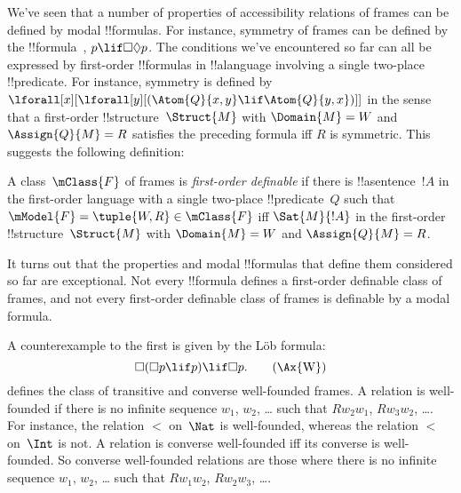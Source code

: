 \documentclass[../../../include/open-logic-section]{subfiles}
\begin{document}

We've seen that a number of properties of accessibility relations of
frames can be defined by modal !!{formula}s. For instance, symmetry of
frames can be defined by the !!{formula}~, $p \lif \Box\Diamond
p$. The conditions we've encountered so far can all be expressed by
first-order !!{formula}s in !!a{language} involving a single two-place
!!{predicate}. For instance, symmetry is defined by
$\lforall[x][\lforall[y][(\Atom{Q}{x,y} \lif \Atom{Q}{y, x})]]$ in the
sense that a first-order !!{structure}~$\Struct{M}$ with $\Domain{M} =
W$ and $\Assign{Q}{M} = R$ satisfies the preceding formula iff $R$ is
symmetric. This suggests the following definition:

\begin{defn}
  A class~$\mClass{F}$ of frames is \emph{first-order definable} if there is
  !!a{sentence}~$!A$ in the first-order language with a single
  two-place !!{predicate}~$Q$ such that $\mModel{F} =
  \tuple{W, R} \in \mClass{F}$ iff $\Sat{M}{!A}$ in the first-order
  !!{structure}~$\Struct{M}$ with $\Domain{M} = W$ and $\Assign{Q}{M}
  = R$.
\end{defn}

It turns out that the properties and modal !!{formula}s that define
them considered so far are exceptional. Not every !!{formula} defines
a first-order definable class of frames, and not every first-order
definable class of frames is definable by a modal formula.

A counterexample to the first is given by the L\"ob formula:
\begin{equation}
\Box(\Box p \lif p) \lif \Box p. \tag{\Ax{W}}
\end{equation}
 defines the class of transitive and converse well-founded
frames. A relation is well-founded if there is no infinite sequence
$w_1$, $w_2$, \dots{} such that $Rw_2w_1$, $Rw_3w_2$, \dots. For
instance, the relation $<$ on~$\Nat$ is well-founded, whereas the
relation $<$ on~$\Int$ is not. A relation is converse well-founded
iff its converse is well-founded. So converse well-founded relations
are those where there is no infinite sequence $w_1$, $w_2$, \dots{}
such that $Rw_1w_2$, $Rw_2w_3$, \dots. 
\end{document}
